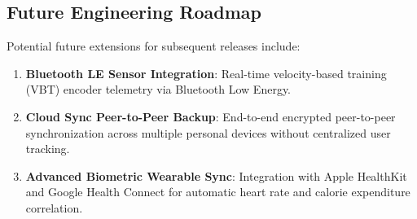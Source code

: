 \subsection{Future Engineering Roadmap}
Potential future extensions for subsequent releases include:
\begin{enumerate}
    \item \textbf{Bluetooth LE Sensor Integration}: Real-time velocity-based training (VBT) encoder telemetry via Bluetooth Low Energy.
    \item \textbf{Cloud Sync Peer-to-Peer Backup}: End-to-end encrypted peer-to-peer synchronization across multiple personal devices without centralized user tracking.
    \item \textbf{Advanced Biometric Wearable Sync}: Integration with Apple HealthKit and Google Health Connect for automatic heart rate and calorie expenditure correlation.
\end{enumerate}
